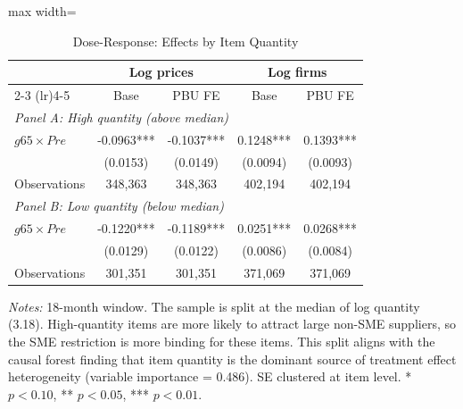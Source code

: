 \begin{table}[htbp]
\centering
\caption{Dose-Response: Effects by Item Quantity}
\label{tab:dose_response}
\begin{adjustbox}{max width=\textwidth}
\begin{threeparttable}
\small
\begin{tabular}{lcccc}
\toprule
 & \multicolumn{2}{c}{Log prices} & \multicolumn{2}{c}{Log firms} \\
\cmidrule(lr){2-3} \cmidrule(lr){4-5}
 & Base & PBU FE & Base & PBU FE \\
\midrule
\multicolumn{5}{l}{\textit{Panel A: High quantity (above median)}} \\
$g65 \times Pre$ & -0.0963*** & -0.1037*** & 0.1248*** & 0.1393*** \\
 & (0.0153) & (0.0149) & (0.0094) & (0.0093) \\
Observations & 348,363 & 348,363 & 402,194 & 402,194 \\
\midrule
\multicolumn{5}{l}{\textit{Panel B: Low quantity (below median)}} \\
$g65 \times Pre$ & -0.1220*** & -0.1189*** & 0.0251*** & 0.0268*** \\
 & (0.0129) & (0.0122) & (0.0086) & (0.0084) \\
Observations & 301,351 & 301,351 & 371,069 & 371,069 \\
\bottomrule
\end{tabular}
\begin{tablenotes}
\small
\item \textit{Notes:} 18-month window. The sample is split at the median of log quantity (3.18). High-quantity items are more likely to attract large non-SME suppliers, so the SME restriction is more binding for these items. This split aligns with the causal forest finding that item quantity is the dominant source of treatment effect heterogeneity (variable importance = 0.486). SE clustered at item level. * $p<0.10$, ** $p<0.05$, *** $p<0.01$.
\end{tablenotes}
\end{threeparttable}
\end{adjustbox}
\end{table}
